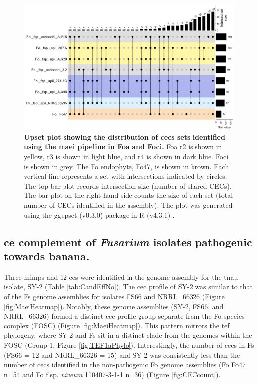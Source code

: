 \begin{figure}
    \centering
    \includegraphics[width=\textwidth]{Figures/UpSetCECofApii.png}
    \captionsetup{width = 22cm}
    \caption[Upset plot of \ac{cec} distribution between \ac{Foa} and \ac{Foci}.]{\textbf{Upset plot showing the distribution of \acp{cec} sets identified using the \ac{maei} pipeline in \ac{Foa} and \ac{Foci}.} \ac{Foa} \ac{r2} is shown in yellow, \ac{r3} is shown in light blue,  and \ac{r4} is shown in dark blue. \ac{Foci} is shown in grey. The \ac{Fo} endophyte, Fo47, is shown in brown. Each vertical line represents a set with intersections indicated by circles. The top bar plot records intersection size (number of shared CECs). The bar plot on the right-hand side counts the size of each set (total number of CECs identified in the assembly). The plot was generated using the ggupset (v0.3.0) \parencite{ggupset} package in R (v4.3.1) \parencite{R}.}
    \label{fig:UpSetCECofFoa}
\end{figure}


\subsection{\Acl{ce} complement of \textit{Fusarium} isolates pathogenic towards banana.} 

 Three \acp{mimp} and 12 \acp{ce} were identified in the genome assembly for the \ac{tnau} isolate, SY-2 (Table \ref{tab:CandEffNo}). The \ac{cec} profile of SY-2 was similar to that of the \ac{Fs} genome assemblies for isolates FS66 and NRRL\_66326 (Figure \ref{fig:MaeiHeatmap}). Notably, these genome assemblies (SY-2, FS66, and NRRL\_66326) formed a distinct \ac{cec} profile group separate from the \ac{Fo} species complex (FOSC) (Figure \ref{fig:MaeiHeatmap}). This pattern mirrors the \ac{tef} phylogeny, where SY-2 and \ac{Fs} sit in a distinct clade from the genomes within the \ac{FOSC} (Group 1, Figure \ref{fig:TEF1aPhylo}). Interestingly, the number of \acp{cec} in \ac{Fs} (FS66 = 12 and NRRL\_66326 = 15) and SY-2 was consistently less than the number of \acp{cec} identified in the non-pathogenic \ac{Fo} genome assemblies (\ac{Fo} Fo47 n=54 and \ac{Fo} f.sp. \textit{niveum} 110407-3-1-1 n=36) (Figure \ref{fig:CECcount}).

